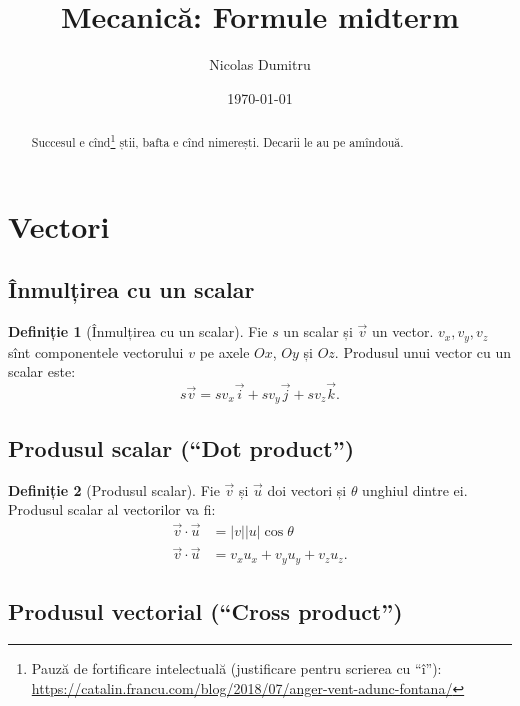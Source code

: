 \documentclass[a4paper]{article}
\title{Mecanică: Formule midterm}
\author{Nicolas Dumitru}
\date{\today}
\theoremstyle{definition}
\newtheorem{definition}{Definiție}[section]
\theoremstyle{plain}%
\theoremstyle{remark}
\begin{document}
\maketitle

\begin{abstract}
	Succesul e cînd\footnote{Pauză de fortificare intelectuală (justificare pentru scrierea cu ``î''): \url{https://catalin.francu.com/blog/2018/07/anger-vent-adunc-fontana/}} știi, bafta e cînd nimerești. Decarii le au pe amîndouă.
\end{abstract}

\section{Vectori}

\subsection{Înmulțirea cu un scalar}

\begin{definition}[Înmulțirea cu un scalar]
	Fie \(s\) un scalar și \(\vec{v}\) un vector. \(v_x, v_y, v_z\) sînt componentele vectorului \(v\) pe axele \(Ox\), \(Oy\) și \(Oz\). Produsul unui vector cu un scalar este:
	\begin{equation*}
		s \vec{v} = s v_x \vec{i} + s v_y \vec{j} + s v_z \vec{k} \text{.}
	\end{equation*}
\end{definition}

\subsection{Produsul scalar (``Dot product'')}

\begin{definition}[Produsul scalar]
	Fie \(\vec{v}\) și \(\vec{u}\) doi vectori și \(\theta\) unghiul dintre ei. Produsul scalar al vectorilor va fi:
	\begin{align*}
		\vec{v} \cdot \vec{u} & = \left|v\right| \left|u\right| \cos \theta \\
		\vec{v} \cdot \vec{u} & = v_x u_x + v_y u_y + v_z u_z \text{.}
	\end{align*}
\end{definition}

\subsection{Produsul vectorial (``Cross product'')}
\end{document}
